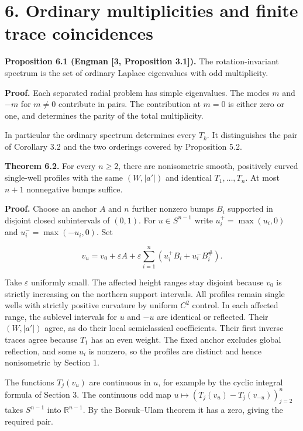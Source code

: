 \documentclass[11pt,letterpaper]{article}
\begin{document}
\section{6. Ordinary multiplicities and finite trace
coincidences}\label{ordinary-multiplicities-and-finite-trace-coincidences}

\textbf{Proposition 6.1 (Engman [3, Proposition 3.1]).} The rotation-invariant spectrum
is the set of ordinary Laplace eigenvalues with odd multiplicity.

\textbf{Proof.} Each separated radial problem has simple eigenvalues. The modes \(m\) and
\(-m\) for \(m\ne0\) contribute in pairs. The contribution at \(m=0\) is either zero or one,
and determines the parity of the total multiplicity.

In particular the ordinary spectrum determines every \(T_k\). It distinguishes the pair of
Corollary 3.2 and the two orderings covered by Proposition 5.2.

\textbf{Theorem 6.2.} For every \(n\ge2\), there are nonisometric smooth, positively curved
single-well profiles with the same \((W,|a'|)\) and identical \(T_1,\ldots,T_n\). At most
\(n+1\) nonnegative bumps suffice.

\textbf{Proof.} Choose an anchor \(A\) and \(n\) further nonzero bumps \(B_i\) supported in
disjoint closed subintervals of \((0,1)\). For \(u\in S^{n-1}\) write \(u_i^+=\max(u_i,0)\)
and \(u_i^-=\max(-u_i,0)\). Set

\[v_u=v_0+\varepsilon A+\varepsilon\sum_{i=1}^n(u_i^+B_i+u_i^-B_i^\#).\]

Take \(\varepsilon\) uniformly small. The affected height ranges stay disjoint because
\(v_0\) is strictly increasing on the northern support intervals. All profiles remain single
wells with strictly positive curvature by uniform \(C^2\) control. In each affected range,
the sublevel intervals for \(u\) and \(-u\) are identical or reflected. Their \((W,|a'|)\)
agree, as do their local semiclassical coefficients. Their first inverse traces agree
because \(T_1\) has an even weight. The fixed anchor excludes global reflection, and some
\(u_i\) is nonzero, so the profiles are distinct and hence nonisometric by Section 1.

The functions \(T_j(v_u)\) are continuous in \(u\), for example by the cyclic integral
formula of Section 3. The continuous odd map \(u\mapsto(T_j(v_u)-T_j(v_{-u}))_{j=2}^n\)
takes \(S^{n-1}\) into \(\mathbb R^{n-1}\). By the Borsuk--Ulam theorem it has a zero,
giving the required pair.
\end{document}
